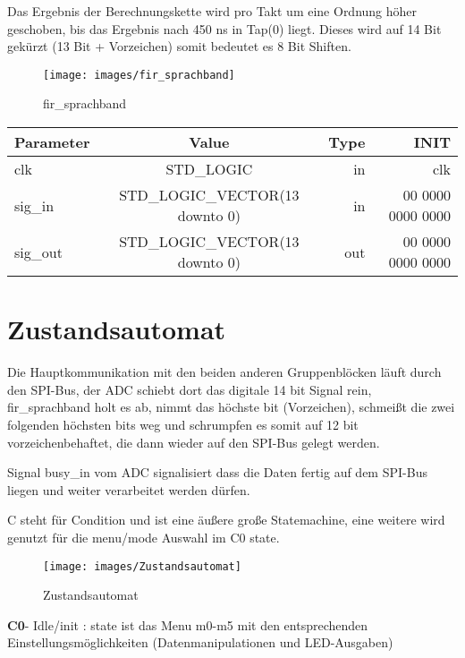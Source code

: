 Das Ergebnis der Berechnungskette wird pro Takt um eine Ordnung höher geschoben, bis das Ergebnis nach 450 ns in Tap(0) liegt. Dieses wird auf 14 Bit gekürzt (13 Bit + Vorzeichen) somit bedeutet es 8 Bit Shiften.


\begin{figure}[H]
\centering
\texttt{[image: images/fir\_sprachband]}
\caption{fir\_sprachband}
\label{fig:fir_sprachband}
\end{figure}


\begin{table}[H]
	\centering
	\begin{tabular}{|l|c|r|r|}
		\hline
		\rowcolor{green}Parameter & Value & Type & INIT\\
		\hline
		clk & STD\_LOGIC & in & clk\\
		\hline
		sig\_in & STD\_LOGIC\_VECTOR(13 downto 0) & in & 00 0000 0000 0000\\
		\hline
		sig\_out  & STD\_LOGIC\_VECTOR(13 downto 0) & out & 00 0000 0000 0000\\
		\hline
	\end{tabular}
\end{table}

\section{Zustandsautomat}
Die Hauptkommunikation mit den beiden anderen Gruppenblöcken läuft durch den SPI-Bus, der ADC schiebt dort das digitale 14 bit Signal rein, fir\_sprachband holt es ab, nimmt das höchste bit (Vorzeichen), schmeißt die zwei folgenden höchsten bits weg und schrumpfen es somit auf 12 bit vorzeichenbehaftet, die dann wieder auf den SPI-Bus gelegt werden.

Signal busy\_in vom ADC signalisiert dass die Daten fertig auf dem SPI-Bus liegen und weiter verarbeitet werden dürfen.

C steht für Condition und ist eine äußere große Statemachine, eine weitere wird genutzt für die menu/mode Auswahl im C0 state.

\begin{figure}[H]
\centering
\texttt{[image: images/Zustandsautomat]}
\caption{Zustandsautomat}
\label{fig:Zustandsautomat}
\end{figure}


\textbf{C0}- Idle/init : state ist das Menu m0-m5 mit den entsprechenden Einstellungsmöglichkeiten (Datenmanipulationen und LED-Ausgaben)

